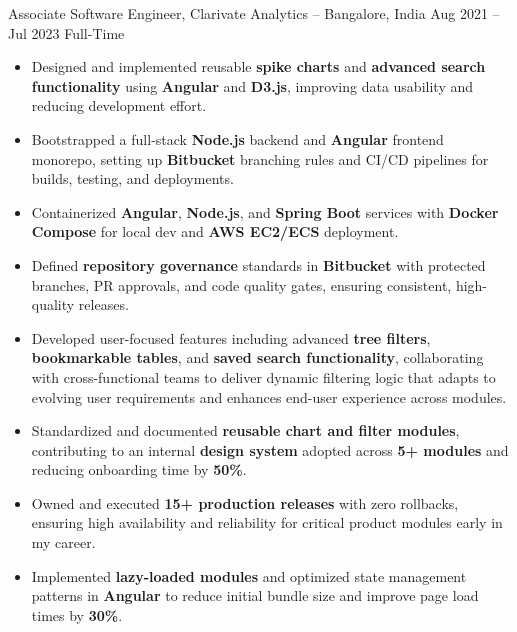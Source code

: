 \documentclass[10pt, letterpaper]{article}
\newenvironment{highlights}{\begin{itemize}[topsep=0.10 cm, parsep=0.10 cm, partopsep=0pt, itemsep=2pt, leftmargin=10pt]}{\end{itemize}}
\begin{document}
\experienceentry
  {Associate Software Engineer, Clarivate Analytics -- Bangalore, India}
  {Aug 2021 -- Jul 2023}
  {Full-Time}
  {
    \begin{highlights}
    \item Designed and implemented reusable \textbf{spike charts} and \textbf{advanced search functionality} using \textbf{Angular} and \textbf{D3.js}, improving data usability and reducing development effort.
    \item Bootstrapped a full-stack \textbf{Node.js} backend and \textbf{Angular} frontend monorepo, setting up \textbf{Bitbucket} branching rules and CI/CD pipelines for builds, testing, and deployments.
    
    
    \item Containerized \textbf{Angular}, \textbf{Node.js}, and \textbf{Spring Boot} services with \textbf{Docker Compose} for local dev and \textbf{AWS EC2/ECS} deployment.
    
    \item Defined \textbf{repository governance} standards in \textbf{Bitbucket} with protected branches, PR approvals, and code quality gates, ensuring consistent, high-quality releases.

    \item Developed user-focused features including advanced \textbf{tree filters}, \textbf{bookmarkable tables}, and \textbf{saved search functionality}, collaborating with cross-functional teams to deliver dynamic filtering logic that adapts to evolving user requirements and enhances end-user experience across modules.

    \item Standardized and documented \textbf{reusable chart and filter modules}, contributing to an internal \textbf{design system} adopted across \textbf{5+ modules} and reducing onboarding time by \textbf{50\%}.

    \item Owned and executed \textbf{15+ production releases} with zero rollbacks, ensuring high availability and reliability for critical product modules early in my career.

    \item Implemented \textbf{lazy-loaded modules} and optimized state management patterns in \textbf{Angular} to reduce initial bundle size and improve page load times by \textbf{30\%}.


\end{highlights}}
\end{document}
